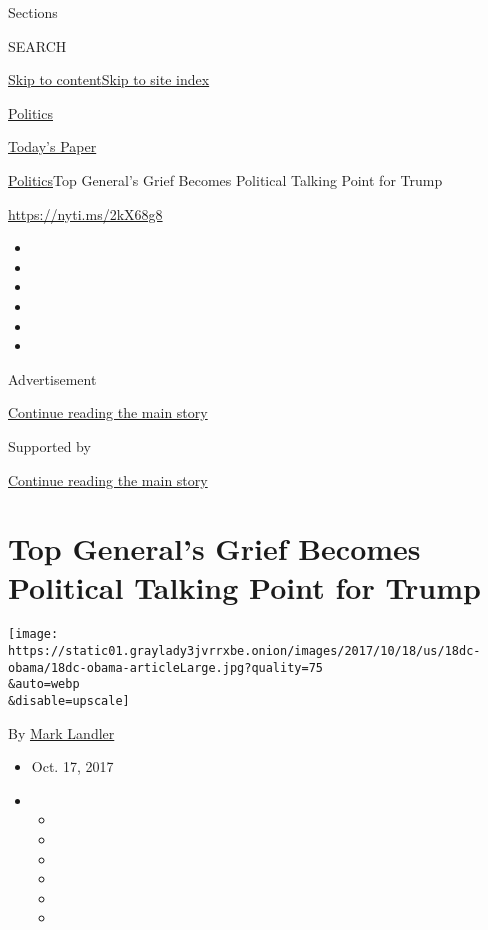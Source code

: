 Sections

SEARCH

\protect\hyperlink{site-content}{Skip to
content}\protect\hyperlink{site-index}{Skip to site index}

\href{https://www.nytimes3xbfgragh.onion/section/politics}{Politics}

\href{https://myaccount.nytimes3xbfgragh.onion/auth/login?response_type=cookie\&client_id=vi}{}

\href{https://www.nytimes3xbfgragh.onion/section/todayspaper}{Today's
Paper}

\href{/section/politics}{Politics}\textbar{}Top General's Grief Becomes
Political Talking Point for Trump

\url{https://nyti.ms/2kX68g8}

\begin{itemize}
\item
\item
\item
\item
\item
\item
\end{itemize}

Advertisement

\protect\hyperlink{after-top}{Continue reading the main story}

Supported by

\protect\hyperlink{after-sponsor}{Continue reading the main story}

\hypertarget{top-generals-grief-becomes-political-talking-point-for-trump}{%
\section{Top General's Grief Becomes Political Talking Point for
Trump}\label{top-generals-grief-becomes-political-talking-point-for-trump}}

\texttt{[image: https://static01.graylady3jvrrxbe.onion/images/2017/10/18/us/18dc-obama/18dc-obama-articleLarge.jpg?quality=75\\\&auto=webp\\\&disable=upscale]}

By \href{http://www.nytimes3xbfgragh.onion/by/mark-landler}{Mark
Landler}

\begin{itemize}
\item
  Oct. 17, 2017
\item
  \begin{itemize}
  \item
  \item
  \item
  \item
  \item
  \item
  \end{itemize}
\end{itemize}

